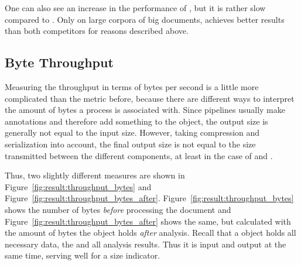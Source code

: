 One can also see an increase in the performance of \spark{}, but it is rather slow compared to \uimaas{}. Only on large corpora of big documents, \spark{} achieves better results than both competitors for reasons described above.

\subsection{Byte Throughput}
Measuring the throughput in terms of bytes per second is a little more complicated than the metric before, because there are different ways to interpret the amount of bytes a process is associated with. Since pipelines usually make annotations and therefore add something to the \cas{} object, the output size is generally not equal to the input size. However, taking compression and serialization into account, the final output size is not equal to the size transmitted between the different components, at least in the case of \spark{} and \uimaas{}.

Thus, two slightly different measures are shown in Figure~\ref{fig:result:throughput_bytes} and Figure~\ref{fig:result:throughput_bytes_after}. Figure~\ref{fig:result:throughput_bytes} shows the number of bytes \emph{before} processing the document and Figure~\ref{fig:result:throughput_bytes_after} shows the same, but calculated with the amount of bytes the \cas{} object holds \emph{after} analysis. Recall that a \cas{} object holds all necessary data, the \sofa{} and all analysis results. Thus it is input and output at the same time, serving well for a size indicator.

